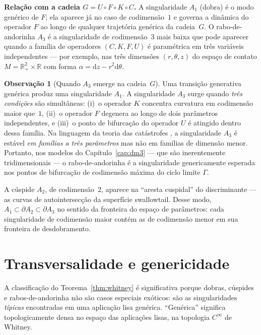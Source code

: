 \documentclass[12pt,a4paper,twoside]{book}
\theoremstyle{plain}
\theoremstyle{definition}
\theoremstyle{definition}
\newtheorem{observacao}[teorema]{Observação}
\newcommand{\R}{\mathbb{R}}
\newcommand{\dd}{\mathrm{d}}
\begin{document}
\textbf{Relação com a cadeia $G = U \circ F \circ K \circ C$.}
A singularidade $A_{1}$ (dobra) é o modo genérico de $F$; ela aparece
já no caso de codimensão~$1$ e governa a dinâmica do operador $F$ ao longo
de qualquer trajetória genérica da cadeia~$G$. O rabo-de-andorinha $A_{3}$
é a singularidade de codimensão~$3$ mais baixa que pode aparecer quando a
família de operadores $(C,K,F,U)$ é paramétrica em três variáveis
independentes --- por exemplo, nas três dimensões $(r,\theta,z)$ do espaço
de contato $M = \R^{2}_{+} \times \R$ com forma $\alpha = \dd z - r^{2}\dd\theta$.

\begin{observacao}[Quando $A_{3}$ emerge na cadeia~$G$]
Uma transição generativa genérica produz uma singularidade $A_{1}$.
A singularidade $A_{3}$ surge quando \emph{três condições} são simultâneas:
(i)~o operador $K$ concentra curvatura em codimensão maior que~$1$,
(ii)~o operador $F$ degenera ao longo de dois parâmetros independentes, e
(iii)~o ponto de bifurcação do operador $U$ é atingido dentro dessa família.
Na linguagem da teoria das catástrofes \cite{Thom1975}, a singularidade
$A_{3}$ é estável \emph{em famílias a três parâmetros} mas não em famílias
de dimensão menor. Portanto, nos modelos do Capítulo~\ref{cap:dm3}
--- que são inerentemente tridimensionais --- o rabo-de-andorinha é a
singularidade genericamente esperada nos pontos de bifurcação de codimensão
máxima do ciclo limite $\Gamma$.
\end{observacao}

A cúspide $A_{2}$, de codimensão~$2$, aparece na ``aresta cuspidal'' do
discriminante --- as curvas de autointersecção da superfície swallowtail.
Desse modo, $A_{1} \subset \partial A_{2} \subset \partial A_{3}$ no sentido
da fronteira do espaço de parâmetros: cada singularidade de codimensão maior
contém as de codimensão menor em sua fronteira de desdobramento.

\section{Transversalidade e genericidade}
\label{sec:transversalidade}

A classificação do Teorema~\ref{thm:whitney} é significativa porque dobras,
cúspides e rabos-de-andorinha não são casos especiais exóticos: são as
singularidades \emph{típicas} encontradas em uma aplicação lisa genérica.
``Genérica'' significa topologicamente densa no espaço das aplicações lisas,
na topologia $C^{\infty}$ de Whitney.
\end{document}
